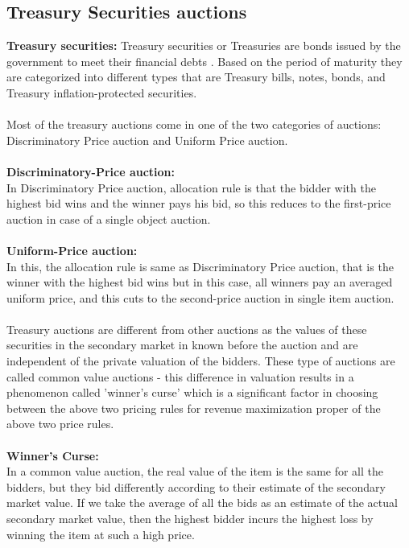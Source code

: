 \documentclass[a4paper]{article}
\begin{document}
\subsection*{Treasury Securities auctions}

\textbf{Treasury securities:} Treasury securities or Treasuries are bonds issued by the government to meet their financial debts \cite{rbi}. Based on the period of maturity they are categorized into different types that are Treasury bills, notes, bonds, and Treasury inflation-protected securities.
\\\\
Most of the treasury auctions come in one of the two categories of auctions: Discriminatory Price auction and Uniform Price auction.
\\\\
\textbf{Discriminatory-Price auction:} \\In Discriminatory Price auction, allocation rule is that the bidder with the highest bid wins and the winner pays his bid, so this reduces to the first-price auction in case of a single object auction.
\\\\
\textbf{Uniform-Price auction:} \\In this, the allocation rule is same as Discriminatory Price auction, that is the winner with the highest bid wins but in this case, all winners pay an averaged uniform price, and this cuts to the second-price auction in single item auction.
\\\\
Treasury auctions are different from other auctions as the values of these securities in the secondary market in known before the auction and are independent of the private valuation of the bidders. These type of auctions are called common value auctions - this difference in valuation results in a phenomenon called 'winner's curse' which is a significant factor in choosing between the above two pricing rules for revenue maximization proper of the above two price rules.
\\\\
\textbf{Winner's Curse:}\\ In a common value auction, the real value of the item is the same for all the bidders, but they bid differently according to their estimate of the secondary market value. If we take the average of all the bids as an estimate of the actual secondary market value, then the highest bidder incurs the highest loss by winning the item at such a high price.
\\\\
\end{document}
